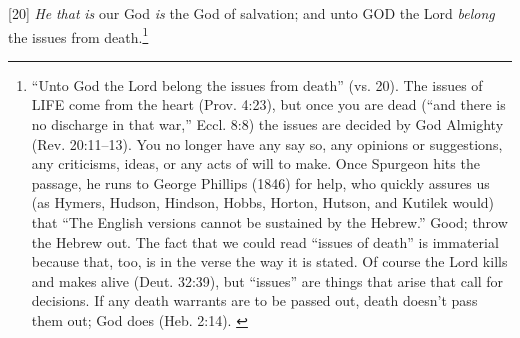 [20] \textcolor[rgb]{0.00,0.00,1.00}{\emph{He} \emph{that} \emph{is} our God \emph{is} the God of salvation; and unto GOD the Lord \emph{belong} the issues from death.}\footnote{“Unto God the Lord belong the issues from death” (vs. 20). The issues of LIFE come from the heart (Prov. 4:23), but once you are dead (“and there is no discharge in that war,” Eccl. 8:8) the issues are decided by God Almighty (Rev. 20:11–13). You no longer have any say so, any opinions or suggestions, any criticisms, ideas, or any acts of will to make. Once Spurgeon hits the passage, he runs to George Phillips (1846) for help, who quickly assures us (as Hymers, Hudson, Hindson, Hobbs, Horton, Hutson, and Kutilek would) that “The English versions cannot be sustained by the Hebrew.” Good; throw the Hebrew out. The fact that we could read “issues of death” is immaterial because that, too, is in the verse the way it is stated. Of course the Lord kills and makes alive (Deut. 32:39), but “issues” are things that arise that call for decisions. If any death warrants are to be passed out, death doesn’t pass them out; God does (Heb. 2:14).  \cite{Ruckman1992Psalms}  }

